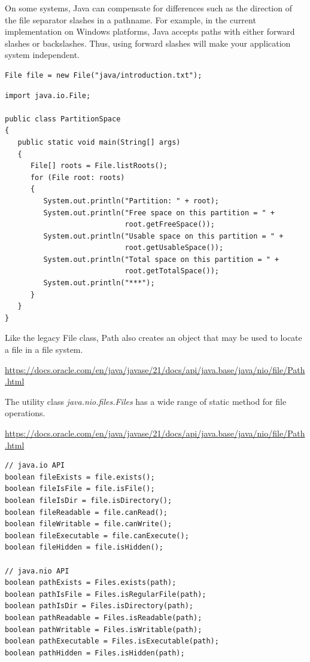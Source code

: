 On some systems,  Java can compensate for differences such as the direction of the file separator slashes in a pathname.  For example,  in the current implementation on Windows platforms,  Java accepts paths with either forward slashes or backslashes.
Thus, using forward slashes will make your application system independent.

\begin{lstlisting}
File file = new File("java/introduction.txt");
\end{lstlisting}


\begin{lstlisting}
import java.io.File;

public class PartitionSpace
{
   public static void main(String[] args)
   {
      File[] roots = File.listRoots();
      for (File root: roots)
      {
         System.out.println("Partition: " + root);
         System.out.println("Free space on this partition = " +
                            root.getFreeSpace());
         System.out.println("Usable space on this partition = " +
                            root.getUsableSpace());
         System.out.println("Total space on this partition = " +
                            root.getTotalSpace());
         System.out.println("***");
      }
   }
}
\end{lstlisting}


Like the legacy File class, Path also creates an object that may be used to locate a file in a file system.

\begin{thm}
        \url{https://docs.oracle.com/en/java/javase/21/docs/api/java.base/java/nio/file/Path.html}
    \end{thm}
    
    
The utility class \textit{java.nio.files.Files} has a wide range of static method for file operations. 

\begin{thm}
        \url{https://docs.oracle.com/en/java/javase/21/docs/api/java.base/java/nio/file/Path.html}
    \end{thm}


\begin{lstlisting}
// java.io API
boolean fileExists = file.exists();
boolean fileIsFile = file.isFile();
boolean fileIsDir = file.isDirectory();
boolean fileReadable = file.canRead();
boolean fileWritable = file.canWrite();
boolean fileExecutable = file.canExecute();
boolean fileHidden = file.isHidden();

// java.nio API
boolean pathExists = Files.exists(path);
boolean pathIsFile = Files.isRegularFile(path);
boolean pathIsDir = Files.isDirectory(path);
boolean pathReadable = Files.isReadable(path);
boolean pathWritable = Files.isWritable(path);
boolean pathExecutable = Files.isExecutable(path);
boolean pathHidden = Files.isHidden(path);
\end{lstlisting}

